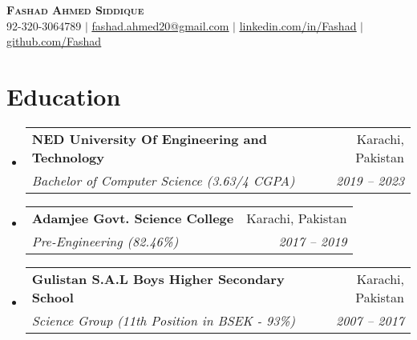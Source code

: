 \documentclass[letterpaper,11pt]{article}
\makeatletter
\newcommand{\resumeSubheading}[4]{
  \vspace{-2pt}\item
    \begin{tabular*}{0.97\textwidth}[t]{l@{\extracolsep{\fill}}r}
      \textbf{#1} & #2 \\
      \textit{\small#3} & \textit{\small #4} \\
    \end{tabular*}\vspace{-7pt}
}
\newcommand{\resumeSubHeadingListStart}{\begin{itemize}[leftmargin=0.15in, label={}]}
\newcommand{\resumeSubHeadingListEnd}{\end{itemize}}
\makeatother
\begin{document}

\begin{center}
    \textbf{\Huge \scshape Fashad Ahmed Siddique} \\ \vspace{1pt}
    \small 92-320-3064789 $|$ \href{mailto:fashad.ahmed20@gmail.com}{\underline{fashad.ahmed20@gmail.com}} $|$ 
    \href{https://www.linkedin.com/in/fashad-ahmed-siddique-285a79207/}{\underline{linkedin.com/in/Fashad}} $|$
    \href{https://github.com/Fashad-Ahmed}{\underline{github.com/Fashad}}
\end{center}


\section{Education}
  \resumeSubHeadingListStart
    \resumeSubheading
      {NED University Of Engineering and Technology}{Karachi, Pakistan}
      {Bachelor of Computer Science (3.63/4 CGPA)}{2019 -- 2023}
    \resumeSubheading
      {Adamjee Govt. Science College}{Karachi, Pakistan}
      {Pre-Engineering (82.46\%)}{2017 -- 2019}
    \resumeSubheading
      {Gulistan S.A.L Boys Higher Secondary School}{Karachi, Pakistan}
      {Science Group (11th Position in BSEK - 93\%)}{2007 -- 2017}
  \resumeSubHeadingListEnd


\end{document}
